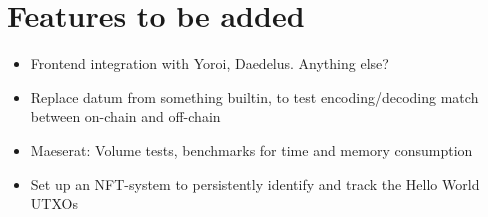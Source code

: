\documentclass{article}
\begin{document}
\section{Features to be added}

\begin{itemize}
  \item Frontend integration with Yoroi, Daedelus. Anything else?
  \item Replace datum from something builtin, to test encoding/decoding match
    between on-chain and off-chain
  \item Maeserat: Volume tests, benchmarks for time and memory consumption
  \item Set up an NFT-system to persistently identify and track the Hello World
    UTXOs
\end{itemize}
\end{document}
